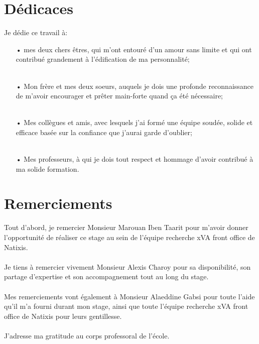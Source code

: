 \documentclass[a4paper,12pt]{report}
\numberwithin{equation}{section}
\theoremstyle{definition}
\numberwithin{equation}{section}
\begin{document}
\chapter*{Dédicaces}
Je dédie ce travail à:
\vspace*{0.5cm}
\begin{enumerate}
\item[•] mes deux chers êtres, qui m'ont entouré d'un amour sans limite et qui ont contribué grandement à l'édification de ma personnalité;
\\\\
\item[•] Mon frère et mes deux soeurs, auquels je dois une profonde reconnaissance de m'avoir encourager et prêter main-forte quand ça été nécessaire;
\\\\
\item[•] Mes collègues et amis, avec lesquels j'ai formé une équipe soudée, solide et efficace basée sur la confiance que j'aurai garde d'oublier;
\\\\
\item[•] Mes professeurs, à qui je dois tout respect et hommage d'avoir contribué à ma solide formation.
\end{enumerate}
\newpage
\chapter*{Remerciements}
Tout d'abord, je remercier Monsieur Marouan Iben Taarit pour m'avoir donner l'opportunité de réaliser ce stage au sein de l'équipe recherche xVA front office de Natixis.\\\\

Je tiens à remercier vivement Monsieur Alexis Charoy pour sa disponibilité, son partage d'expertise et son accompagnement tout au long du stage.\\\\


Mes remerciements vont également à Monsieur Alaeddine Gabsi pour toute l'aide qu'il m'a fourni durant mon stage, ainsi que toute l'équipe recherche xVA front office de Natixis pour leurs gentillesse.\\\\

J'adresse ma gratitude au corps professoral de l'école.\\\\

\newpage
\begingroup
\hypersetup{linkcolor=midnightblue}
\end{document}

